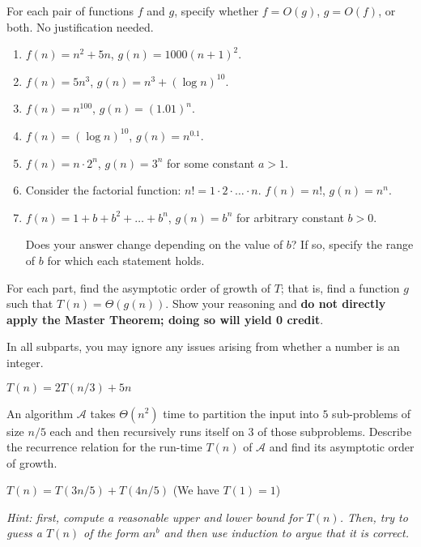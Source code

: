 \documentclass[11pt]{article}
\begin{document}
\newpage
{}
For each pair of functions $f$ and $g$, specify whether $f= O(g)$, $g = O(f)$, or both. 
No justification needed. 
\begin{enumerate}

    \item $f(n) = n^2 + 5n$, $g(n) = 1000(n+1)^2$.

    \item $f(n) = 5 n^3$, $g(n) = n^3 + (\log n)^{10}$.

    \item $f(n) = n^{100}$, $g(n) = (1.01)^n$.

    \item $f(n) = \left(\log n\right)^{10}$, $g(n) = n^{0.1}$.

    \item $f(n) = n \cdot 2^n$, $g(n) = 3^n$ for some constant $a > 1$. 

    \item Consider the factorial function: $n! = 1 \cdot 2 \cdot \hdots \cdot n$.
    $f(n) = n!$, $g(n) = n^n$.

    \item $f(n) = 1 + b + b^2 + \hdots + b^n$, $g(n) = b^n$ for arbitrary constant $b > 0$. 
    
    Does your answer change depending on the value of $b$? If so, specify the range of $b$ for which each statement holds.

\end{enumerate}

\newpage
{}

For each part, find the asymptotic order of growth of $T$; that is, find a function $g$ such that $T(n) = \Theta(g(n))$. Show your reasoning and \textbf{do not directly apply the Master Theorem; doing so will yield 0 credit}.

In all subparts, you may ignore any issues arising from whether a number is an integer.

\begin{subparts}
    \subpart \(T(n)=2T(n/3)+5n\)

    \subpart An algorithm $\mathcal{A}$ takes $\Theta(n^2)$ time to partition the input into $5$ sub-problems of size $n/5$ each and then recursively runs itself on $3$ of those subproblems. Describe the recurrence relation for the run-time $T(n)$ of $\mathcal{A}$ and find its asymptotic order of growth. 

    \subpart \(T(n) = T(3n/5)+T(4n/5)\) (We have $T(1) = 1$)

    \textit{Hint: first, compute a reasonable upper and lower bound for $T(n)$. Then, try to guess a $T(n)$ of the form $an^b$ and then use induction to argue that it is correct.}

\end{subparts}
\end{document}
